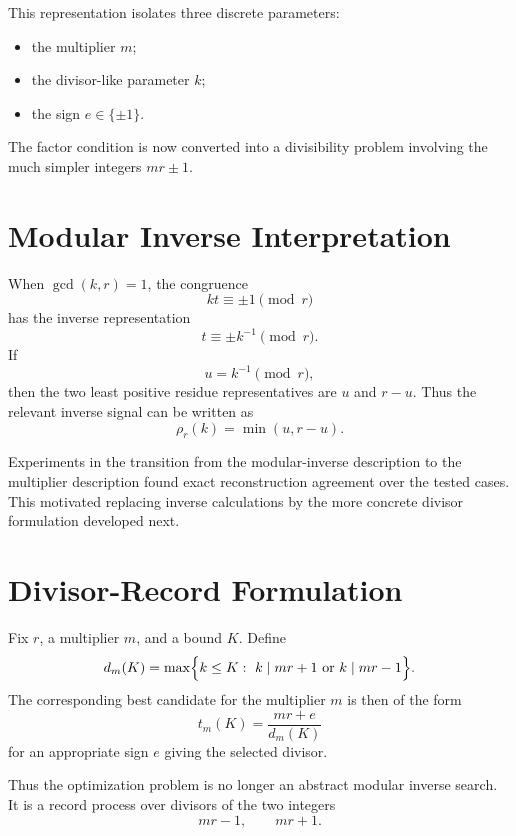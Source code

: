 \documentclass[11pt,a4paper]{article}
\begin{document}
This representation isolates three discrete parameters:
\begin{itemize}[leftmargin=2em]
    \item the multiplier $m$;
    \item the divisor-like parameter $k$;
    \item the sign $e\in\{\pm1\}$.
\end{itemize}

The factor condition is now converted into a divisibility problem involving the much simpler integers $mr\pm1$.

\section{Modular Inverse Interpretation}

When $\gcd(k,r)=1$, the congruence
\[
    kt\equiv\pm1\pmod r
\]
has the inverse representation
\[
    t\equiv\pm k^{-1}\pmod r.
\]
If
\[
    u=k^{-1}\pmod r,
\]
then the two least positive residue representatives are $u$ and $r-u$. Thus the relevant inverse signal can be written as
\begin{equation}
    \rho_r(k)=\min(u,r-u).
\end{equation}

Experiments in the transition from the modular-inverse description to the multiplier description found exact reconstruction agreement over the tested cases. This motivated replacing inverse calculations by the more concrete divisor formulation developed next.

\section{Divisor-Record Formulation}

Fix $r$, a multiplier $m$, and a bound $K$. Define
\begin{equation}
    d_m(K)=
    \max\Bigl\{k\le K:\ k\mid mr+1\text{ or }k\mid mr-1\Bigr\}.
\end{equation}
The corresponding best candidate for the multiplier $m$ is then of the form
\begin{equation}
    t_m(K)=\frac{mr+e}{d_m(K)}
\end{equation}
for an appropriate sign $e$ giving the selected divisor.

Thus the optimization problem is no longer an abstract modular inverse search. It is a record process over divisors of the two integers
\[
    mr-1,
    \qquad
    mr+1.
\]
\end{document}
